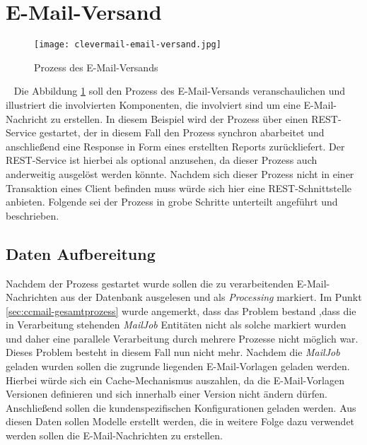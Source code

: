 \section{E-Mail-Versand}
\begin{figure}[h]
\centering
\texttt{[image: clevermail-email-versand.jpg]} %
\caption{Prozess des E-Mail-Versands}
\label{fig:clevermail-email-versand}
\end{figure}
\ \newpage
Die Abbildung \ref{fig:clevermail-email-versand} soll den Prozess des E-Mail-Versands veranschaulichen und illustriert die involvierten Komponenten, die involviert sind um eine E-Mail-Nachricht zu erstellen. In diesem Beispiel wird der Prozess über einen REST-Service gestartet, der in diesem Fall den Prozess synchron abarbeitet und anschließend eine Response in Form eines erstellten Reports zurückliefert. Der REST-Service ist hierbei als optional anzusehen, da dieser Prozess auch anderweitig ausgelöst werden könnte. Nachdem sich dieser Prozess nicht in einer Transaktion eines Client befinden muss würde sich hier eine REST-Schnittstelle anbieten.
\newline
\newline
Folgende sei der Prozess in grobe Schritte unterteilt angeführt und beschrieben.
\subsection{Daten Aufbereitung}
Nachdem der Prozess gestartet wurde sollen die zu verarbeitenden E-Mail-Nachrichten aus der Datenbank ausgelesen und als \emph{Processing} markiert. Im Punkt \ref{sec:ccmail-gesamtprozess} wurde angemerkt, dass das Problem bestand ,dass die in Verarbeitung stehenden \emph{MailJob} Entitäten nicht als solche markiert wurden und daher eine parallele Verarbeitung durch mehrere Prozesse nicht möglich war. Dieses Problem besteht in diesem Fall nun nicht mehr. Nachdem die \emph{MailJob} geladen wurden sollen die zugrunde liegenden E-Mail-Vorlagen geladen werden. Hierbei würde sich ein Cache-Mechanismus auszahlen, da die E-Mail-Vorlagen Versionen definieren und sich innerhalb einer Version nicht ändern dürfen. Anschließend sollen die kundenspezifischen Konfigurationen geladen werden. Aus diesen Daten sollen Modelle erstellt werden, die in weitere Folge dazu verwendet werden sollen die E-Mail-Nachrichten zu erstellen.
